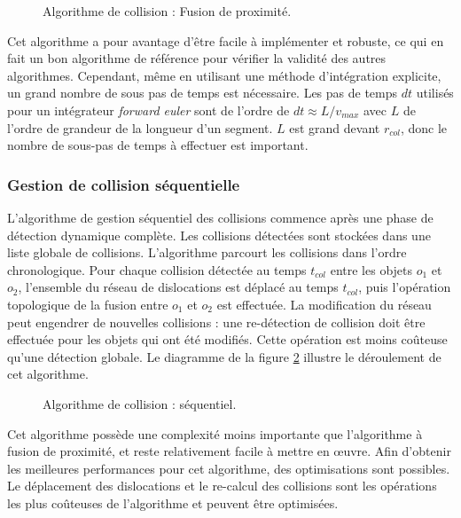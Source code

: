 \documentclass[11pt,class=article,float=false,crop=false]{standalone}
\begin{document}
\begin{figure}[H]
	\centering
	\caption{Algorithme de collision : Fusion de proximité.}
	\label{fig:algo_collision_statique}
\end{figure}

Cet algorithme a pour avantage d'être facile à implémenter et robuste, ce qui en fait un bon algorithme de référence pour vérifier la validité des autres algorithmes. Cependant, même en utilisant une méthode d'intégration explicite, un grand nombre de sous pas de temps est nécessaire. Les pas de temps $dt$ utilisés pour un intégrateur \textit{forward euler} sont de l'ordre de $dt \approx L/v_{max}$ avec $L$ de l'ordre de grandeur de la longueur d'un segment. $L$ est grand devant $r_{col}$, donc le nombre de sous-pas de temps à effectuer est important.

\subsubsection{Gestion de collision séquentielle}

L'algorithme de gestion séquentiel des collisions commence après une phase de détection dynamique complète. Les collisions détectées sont stockées dans une liste globale de collisions. L'algorithme parcourt les collisions dans l'ordre chronologique. Pour chaque collision détectée au temps $t_{col}$ entre les objets $o_1$ et $o_2$, l'ensemble du réseau de dislocations est déplacé au temps $t_{col}$, puis l'opération topologique de la fusion entre $o_1$ et $o_2$ est effectuée. La modification du réseau peut engendrer de nouvelles collisions : une re-détection de collision doit être effectuée pour les objets qui ont été modifiés. Cette opération est moins coûteuse qu'une détection globale. Le diagramme de la figure \ref{fig:algo_collision_sequentiel} illustre le déroulement de cet algorithme.

\begin{figure}[H]
	\centering
	\caption{Algorithme de collision : séquentiel.}
	\label{fig:algo_collision_sequentiel}
\end{figure}

Cet algorithme possède une complexité moins importante que l'algorithme à fusion de proximité, et reste relativement facile à mettre en œuvre. Afin d'obtenir les meilleures performances pour cet algorithme, des optimisations sont possibles. Le déplacement des dislocations et le re-calcul des collisions sont les opérations les plus coûteuses de l'algorithme et peuvent être optimisées. 
\end{document}
